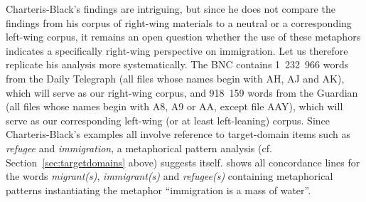 Charteris\hyp{}Black's findings are intriguing, but since he does not compare the findings from his corpus of right\hyp{}wing materials to a neutral or a corresponding left\hyp{}wing corpus, it remains an open question whether the use of these metaphors  indicates a specifically right\hyp{}wing perspective on immigration. Let us therefore replicate  his analysis more systematically. The BNC  contains 1~232~966 words from the Daily Telegraph (all files whose names begin with AH, AJ and AK), which will serve as our right\hyp{}wing corpus, and 918~159 words from the Guardian (all files whose names begin with A8, A9 or AA, except file AAY), which will serve as our corresponding left\hyp{}wing (or at least left\hyp{}leaning) corpus. Since Charteris\hyp{}Black's examples all involve reference to target\hyp{}domain items such as \textit{refugee} and \textit{immigration}, a metaphorical  pattern analysis (cf. Section~\ref{sec:targetdomains} above) suggests itself.  shows all concordance  lines for the words \textit{migrant(s)}, \textit{immigrant(s)} and \textit{refugee(s)} containing metaphorical patterns instantiating the metaphor ``immigration is a mass of water''.

